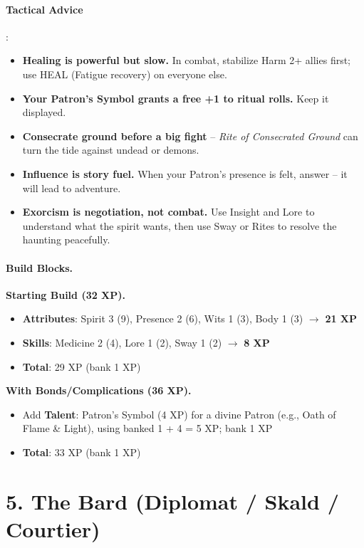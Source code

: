 \paragraph{Tactical Advice}:
\begin{itemize}
\item \textbf{Healing is powerful but slow.} In combat, stabilize Harm 2+ allies first; use HEAL (Fatigue recovery) on everyone else.
\item \textbf{Your Patron's Symbol grants a free +1 to ritual rolls.} Keep it displayed.
\item \textbf{Consecrate ground before a big fight} -- \emph{Rite of Consecrated Ground} can turn the tide against undead or demons.
\item \textbf{Influence is story fuel.} When your Patron's presence is felt, answer -- it will lead to adventure.
\item \textbf{Exorcism is negotiation, not combat.} Use Insight and Lore to understand what the spirit wants, then use Sway or Rites to resolve the haunting peacefully.
\end{itemize}

\paragraph{Build Blocks.}
\textbf{Starting Build (32 XP).}
\begin{itemize}
\item \textbf{Attributes}: Spirit 3 (9), Presence 2 (6), Wits 1 (3), Body 1 (3) \(\rightarrow\) \textbf{21 XP}
\item \textbf{Skills}: Medicine 2 (4), Lore 1 (2), Sway 1 (2) \(\rightarrow\) \textbf{8 XP}
\item \textbf{Total}: 29 XP (bank 1 XP)
\end{itemize}
\textbf{With Bonds/Complications (36 XP).}
\begin{itemize}
\item Add \textbf{Talent}: Patron's Symbol (4 XP) for a divine Patron (e.g., Oath of Flame \& Light), using banked 1 + 4 = 5 XP; bank 1 XP
\item \textbf{Total}: 33 XP (bank 1 XP)
\end{itemize}

\section{5. The Bard (Diplomat / Skald / Courtier)}
\label{sec:concept-bard}

